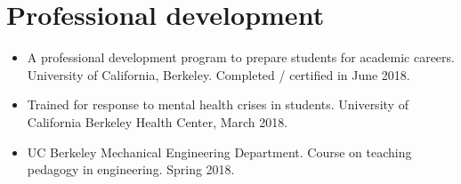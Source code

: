 \documentclass[letterpaper]{deedy-resume} %
\begin{document}
{%





  
  



\vspace{0.2cm}
\section{Professional development}
\vspace{0.2cm}

\begin{itemize}

\item {} A professional development program to prepare students for academic careers. University of California, Berkeley. Completed / certified in June 2018.
  
\item {} Trained for response to mental health crises in students. University of California Berkeley Health Center, March 2018.

\item {} UC Berkeley Mechanical Engineering Department. Course on teaching pedagogy in engineering. Spring 2018.
  

\end{itemize}}
\end{document}
